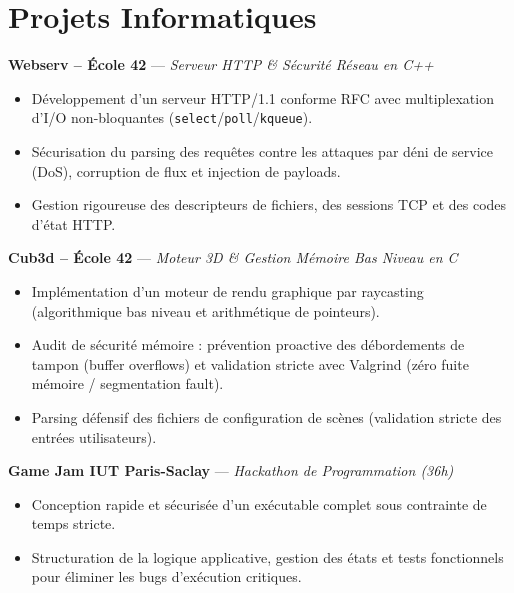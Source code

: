 \documentclass[10pt,a4paper]{article}
\begin{document}
\section*{Projets Informatiques}
{\small
\textbf{Webserv -- École 42} --- \textit{Serveur HTTP \& Sécurité Réseau en C++}
\begin{itemize}
  \item Développement d'un serveur HTTP/1.1 conforme RFC avec multiplexation d'I/O non-bloquantes (\texttt{select}/\texttt{poll}/\texttt{kqueue}).
  \item Sécurisation du parsing des requêtes contre les attaques par déni de service (DoS), corruption de flux et injection de payloads.
  \item Gestion rigoureuse des descripteurs de fichiers, des sessions TCP et des codes d'état HTTP.
\end{itemize}

\vspace{0.25em}
\textbf{Cub3d -- École 42} --- \textit{Moteur 3D \& Gestion Mémoire Bas Niveau en C}
\begin{itemize}
  \item Implémentation d'un moteur de rendu graphique par raycasting (algorithmique bas niveau et arithmétique de pointeurs).
  \item Audit de sécurité mémoire : prévention proactive des débordements de tampon (buffer overflows) et validation stricte avec Valgrind (zéro fuite mémoire / segmentation fault).
  \item Parsing défensif des fichiers de configuration de scènes (validation stricte des entrées utilisateurs).
\end{itemize}

\vspace{0.25em}
\textbf{Game Jam IUT Paris-Saclay} --- \textit{Hackathon de Programmation (36h)}
\begin{itemize}
  \item Conception rapide et sécurisée d'un exécutable complet sous contrainte de temps stricte.
  \item Structuration de la logique applicative, gestion des états et tests fonctionnels pour éliminer les bugs d'exécution critiques.
\end{itemize}
}
\end{document}
